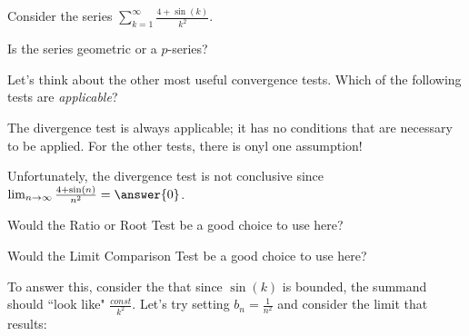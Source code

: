 \documentclass{ximera}
\author{Jim Talamo}
\begin{document}
\begin{exercise}

Consider the series $\sum_{k=1}^{\infty} \frac{4+\sin(k)}{k^2}$.  

Is the series geometric or a $p$-series?

\begin{multipleChoice}
\end{multipleChoice}

Let's think about the other most useful convergence tests.  Which of the following tests are \emph{applicable}?

\begin{selectAll}
\end{selectAll}

\begin{hint}
The divergence test is always applicable; it has no conditions that are necessary to be applied. For the other tests, there is onyl one assumption!
\end{hint}

\begin{exercise}
Unfortunately, the divergence test is not conclusive since $\lim_{n \to \infty} \frac{4+\sin(n)}{n^2} = \answer{0}$.  
\end{exercise}

\begin{exercise}
Would the Ratio or Root Test be a good choice to use here?

\begin{multipleChoice}
\end{multipleChoice}
\end{exercise}

\begin{exercise}
Would the Limit Comparison Test be a good choice to use here?  

To answer this, consider the that since $\sin(k)$ is bounded,  the summand should ``look like" $\frac{const}{k^2}$.  Let's try setting $b_n = \frac{1}{n^2}$ and consider the limit that results:


\end{exercise}
\end{exercise}
\end{document}
